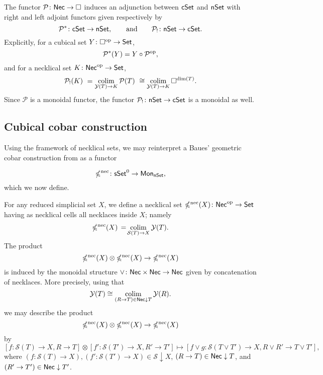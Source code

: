 The functor $\mathcal{P} \colon \mathsf{Nec} \to \square$ induces an adjunction between $\mathsf{cSet}$ and $\mathsf{nSet}$ with right and left adjoint functors given respectively by
\begin{equation*}
\mathcal{P}^\ast \colon \mathsf{cSet} \to \mathsf{nSet},
\qquad \text{and} \qquad
\mathcal{P}_{!}  \colon \mathsf{nSet} \to \mathsf{cSet}.
\end{equation*}
Explicitly, for a cubical set $Y \colon \square^{\mathrm{op}} \to \mathsf{Set}$,
\begin{equation*}
\mathcal{P}^\ast(Y)= Y \circ \mathcal{P}^{\mathrm{op}},
\end{equation*}
and for a necklical set $K \colon \mathsf{Nec}^{\mathrm{op}} \to \mathsf{Set}$,
\begin{equation*}
\mathcal{P}_{!}(K) \ =
\operatorname*{colim}_{\mathcal{Y}(T) \to K} \mathcal{P}(T) \ \cong 
\operatorname*{colim}_{\mathcal{Y}(T) \to K} \square^{\dim(T)}.
\end{equation*}
Since $\mathcal{P}$ is a monoidal functor, the functor $\mathcal{P}_{!} \colon \mathsf{nSet} \to \mathsf{cSet}$ is a monoidal as well.

\subsection{Cubical cobar construction} \label{ss:cubical cobar}

Using the framework of necklical sets, we may reinterpret a Baues' geometric cobar construction from \cite{baues1998hopf} as a functor

\begin{equation*}
\operatorname{\mathbb{\Omega}^{\mathrm{nec}}} \colon \mathsf{sSet}^0 \to \mathsf{Mon}_{\mathsf{nSet}},
\end{equation*}
which we now define.

For any reduced simplicial set $X$, we define a  necklical set $\operatorname{\mathbb{\Omega}^{\mathrm{nec}}}(X) \colon \mathsf{Nec}^{\mathrm{op}} \to \mathsf{Set}$ having as necklical cells all necklaces inside $X$; namely
\begin{equation*}
\operatorname{\mathbb{\Omega}^{\mathrm{nec}}}(X) \, = \! \operatorname*{colim}_{\mathcal{S}(T) \to X} \mathcal{Y}(T).
\end{equation*}
The product 
\[
\operatorname{\mathbb{\Omega}^{\mathrm{nec}}}(X) \otimes \operatorname{\mathbb{\Omega}^{\mathrm{nec}}}(X) \to \operatorname{\mathbb{\Omega}^{\mathrm{nec}}}(X)
\]
is induced by the monoidal structure $\vee \colon \mathsf{Nec} \times \mathsf{Nec} \to \mathsf{Nec}$ given by concatenation of necklaces.
More precisely, using that
\begin{equation*}
    \mathcal{Y}(T) \cong \operatorname*{colim}_{(R \to T) \in \mathsf{Nec} \downarrow T} \mathcal{Y}(R).
\end{equation*} 
we may describe the product
\[
\operatorname{\mathbb{\Omega}^{\mathrm{nec}}}(X) \otimes \operatorname{\mathbb{\Omega}^{\mathrm{nec}}}(X) \to \operatorname{\mathbb{\Omega}^{\mathrm{nec}}}(X)
\]
by
\[
[f\colon \mathcal{S}(T) \to X, R \to T] \otimes [f'\colon \mathcal{S}(T') \to X, R' \to T'] \mapsto [f \vee g\colon \mathcal{S}(T\vee T') \to X, R \vee  R'\to T \vee T'],
\]
where $(f\colon \mathcal{S}(T) \to X), (f'\colon \mathcal{S}(T') \to X) \in \mathcal{S} \downarrow X$, $ (R\to T) \in \mathsf{Nec} \downarrow T$, and $(R' \to T') \in \mathsf{Nec} \downarrow T'$. 

